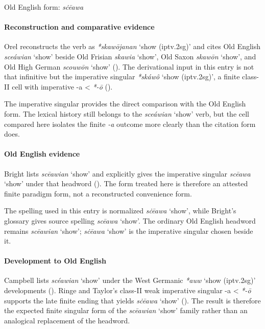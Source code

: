 \documentclass[
  british,
  a4paper,
]{article}
\providecommand{\Recon}[1]{\emph{*#1}}
\begin{document}
Old English form: \emph{sċēawa}

\paragraph{Reconstruction and comparative
evidence}\label{reconstruction-and-comparative-evidence-142}

Orel reconstructs the verb as \Recon{skawōjanan} `show (iptv.2sg)' and
cites Old English \emph{sceáwian} `show' beside Old Frisian
\emph{skawia} `show', Old Saxon \emph{skawōn} `show', and Old High
German \emph{scouwōn} `show' ().
The derivational input in this entry is not that infinitive but the
imperative singular \Recon{skáwô} `show (iptv.2sg)', a finite class-II
cell with imperative -a \textless{} \emph{*-ō}
().

The imperative singular provides the direct comparison with the Old
English form. The lexical history still belongs to the \emph{sceáwian}
`show' verb, but the cell compared here isolates the finite \emph{-a}
outcome more clearly than the citation form does.

\paragraph{Old English evidence}\label{old-english-evidence-142}

Bright lists \emph{scēawian} `show' and explicitly gives the imperative
singular \emph{scēawa} `show' under that headword
(). The form
treated here is therefore an attested finite paradigm form, not a
reconstructed convenience form.

The spelling used in this entry is normalized \emph{sċēawa} `show',
while Bright's glossary gives source spelling \emph{scēawa} `show'. The
ordinary Old English headword remains \emph{scēawian} `show';
\emph{sċēawa} `show' is the imperative singular chosen beside it.

\paragraph{Development to Old
English}\label{development-to-old-english-142}

Campbell lists \emph{scéawian} `show' under the West Germanic
\Recon{auw} `show (iptv.2sg)' developments
(). Ringe and
Taylor's class-II weak imperative singular -a \textless{} \emph{*-ō}
supports the late finite ending that yields \emph{sċēawa} `show'
(). The result
is therefore the expected finite singular form of the \emph{scēawian}
`show' family rather than an analogical replacement of the headword.
\end{document}
